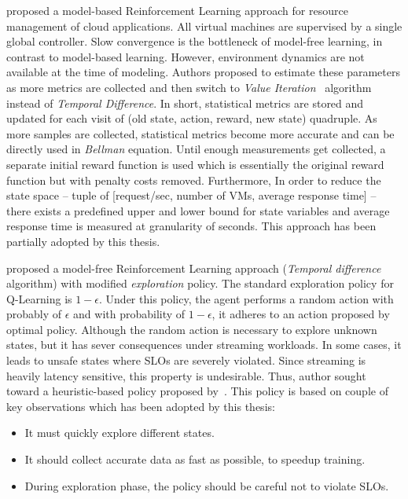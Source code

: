 \textcite{dutreilh:hal-01122123} proposed a model-based Reinforcement Learning approach for resource management of cloud applications. All virtual machines are supervised by a single global controller. Slow convergence is the bottleneck of model-free learning, in contrast to model-based learning. However, environment dynamics are not available at the time of modeling. Authors proposed to estimate these parameters as more metrics are collected and then switch to \emph{Value Iteration}~\cite{rlIntro} algorithm instead of \emph{Temporal Difference}. In short, statistical metrics are stored and updated for each visit of (old state, action, reward, new state) quadruple. As more samples are collected, statistical metrics become more accurate and can be directly used in \emph{Bellman} equation. Until enough measurements get collected, a separate initial reward function is used which is essentially the original reward function but with penalty costs removed. Furthermore, In order to reduce the state space -- tuple of [request/sec, number of VMs, average response time] -- there exists a predefined upper and lower bound for state variables and average response time is measured at granularity of seconds. This approach has been partially adopted by this thesis.

\textcite{Dutreilh2010} proposed a model-free Reinforcement Learning approach (\emph{Temporal difference} algorithm) with modified \emph{exploration} policy. The standard exploration policy for Q-Learning is $1-\epsilon$. Under this policy, the agent performs a random action with probably of $\epsilon$ and with probability of $1-\epsilon$, it adheres to an action proposed by optimal policy. Although the random action is necessary to explore unknown states, but it has sever consequences under streaming workloads. In some cases, it leads to unsafe states where SLOs are severely violated. Since streaming is heavily latency sensitive, this property is undesirable. Thus, author sought toward a heuristic-based policy proposed by~\textcite{Bodik:2009}. This policy is based on couple of key observations which has been adopted by this thesis:
\begin{itemize}
    \item It must quickly explore different states.
    \item It should collect accurate data as fast as possible, to speedup training.
    \item During exploration phase, the policy should be careful not to violate SLOs.
\end{itemize}

